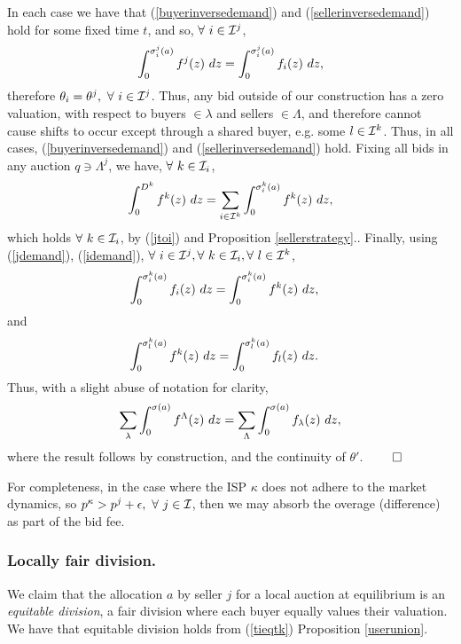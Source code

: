 {In each case we
have that (\ref{buyerinversedemand}) and (\ref{sellerinversedemand}) hold for
some fixed time $t$, and so, $\forall \ i \in\mathcal{I}^j$,
\begin{equation}\label{jdemand}
    \int_0^{\sigma_i^j(a)} f^j(z) \ dz 
    = \int_0^{\sigma_i^j(a)} f_i(z) \ dz,
\end{equation}
therefore $\theta_i = \theta^j, \ \forall \ i \in \mathcal{I}^j$.
Thus, any bid outside of
our construction
has a zero valuation, with respect to buyers $\in\lambda$ and sellers
$\in\Lambda$, and therefore cannot cause shifts to occur except through a
shared buyer, e.g. some $l\in\mathcal{I}^k$. Thus, in all cases,
(\ref{buyerinversedemand}) and (\ref{sellerinversedemand}) hold. Fixing all
bids in any auction $q \ni \Lambda^j$,
we have, $\forall \ k\in\mcI_i$,
\begin{equation}\label{idemand}
    \displaystyle\int_0^{D^k} f^k(z) \ dz = \sum_{i\in\mathcal{I}^k}\int_0^{\sigma_i^k(a)}
f^k(z) \ dz,
\end{equation}
which holds $\forall \ k\in\mcI_i$, by (\ref{jtoi}) and Proposition
\ref{sellerstrategy}..
Finally, using (\ref{jdemand}), (\ref{idemand}), $\forall \ i\in\mathcal{I}^j, \forall \ k\in\mathcal{I}_i,\forall \ l\in\mathcal{I}^k$,
\begin{align}\label{tieqtk}
    \int_0^{\g_i^k(a)} f_i(z) \ dz &= \int_0^{\g_i^k(a)} f^k(z) \ dz,
\end{align}
and
\begin{align}\label{tkeqtl}
    \int_0^{\g_l^k(a)} f^k(z) \ dz &= \int_0^{\g_l^k(a)} f_l(z) \ dz.
\end{align}
Thus, with a slight abuse of notation for clarity,
\begin{equation}\label{funion-eq}
    \sum_{\lambda}\int_0^{\sigma(a)} f^\Lambda(z) \ dz =
\sum_{\Lambda}\int_0^{\sigma(a)} f_\lambda(z) \ dz,
\end{equation}
where the result follows by construction, and the continuity of $\theta'$.
$\qed$}

For completeness, in the case where the ISP $\kappa$ 
does not adhere to the market dynamics, so $p^\kappa > p^j +
\epsilon, \ \forall \ j \in\mathcal{I}$, then we may absorb the overage (difference) as part of the
bid fee.

\subsubsection{Locally fair division.}
We claim that the allocation $a$ by seller $j$ for a local auction at
equilibrium is an \emph{equitable division}, a fair division where each buyer
equally values their valuation. We have that equitable division holds from
(\ref{tieqtk}) Proposition \ref{userunion}. 

